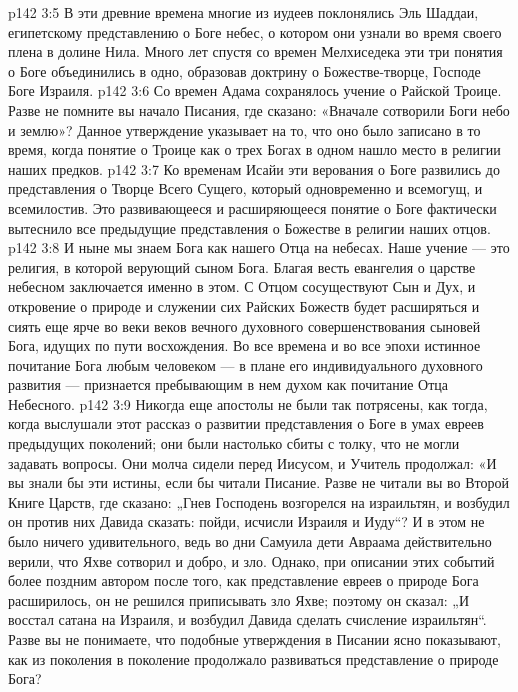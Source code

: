 \vs p142 3:5 \pc {}\bibnobreakspace {} В эти древние времена многие из иудеев поклонялись Эль Шаддаи, египетскому представлению о Боге небес, о котором они узнали во время своего плена в долине Нила. Много лет спустя со времен Мелхиседека эти три понятия о Боге объединились в одно, образовав доктрину о Божестве\hyp{}творце, Господе Боге Израиля.
\vs p142 3:6 \pc {}\bibnobreakspace {} Со времен Адама сохранялось учение о Райской Троице. Разве не помните вы начало Писания, где сказано: «Вначале сотворили Боги небо и землю»? Данное утверждение указывает на то, что оно было записано в то время, когда понятие о Троице как о трех Богах в одном нашло место в религии наших предков.
\vs p142 3:7 \pc {}\bibnobreakspace {} Ко временам Исайи эти верования о Боге развились до представления о Творце Всего Сущего, который одновременно и всемогущ, и всемилостив. Это развивающееся и расширяющееся понятие о Боге фактически вытеснило все предыдущие представления о Божестве в религии наших отцов.
\vs p142 3:8 \pc {}\bibnobreakspace {} И ныне мы знаем Бога как нашего Отца на небесах. Наше учение --- это религия, в которой верующий  сыном Бога. Благая весть евангелия о царстве небесном заключается именно в этом. С Отцом сосуществуют Сын и Дух, и откровение о природе и служении сих Райских Божеств будет расширяться и сиять еще ярче во веки веков вечного духовного совершенствования сыновей Бога, идущих по пути восхождения. Во все времена и во все эпохи истинное почитание Бога любым человеком --- в плане его индивидуального духовного развития --- признается пребывающим в нем духом как почитание Отца Небесного.
\vs p142 3:9 \pc Никогда еще апостолы не были так потрясены, как тогда, когда выслушали этот рассказ о развитии представления о Боге в умах евреев предыдущих поколений; они были настолько сбиты с толку, что не могли задавать вопросы. Они молча сидели перед Иисусом, и Учитель продолжал: «И вы знали бы эти истины, если бы читали Писание. Разве не читали вы во Второй Книге Царств, где сказано: „Гнев Господень возгорелся на израильтян, и возбудил он против них Давида сказать: пойди, исчисли Израиля и Иуду“? И в этом не было ничего удивительного, ведь во дни Самуила дети Авраама действительно верили, что Яхве сотворил и добро, и зло. Однако, при описании этих событий более поздним автором после того, как представление евреев о природе Бога расширилось, он не решился приписывать зло Яхве; поэтому он сказал: „И восстал сатана на Израиля, и возбудил Давида сделать счисление израильтян“. Разве вы не понимаете, что подобные утверждения в Писании ясно показывают, как из поколения в поколение продолжало развиваться представление о природе Бога?
